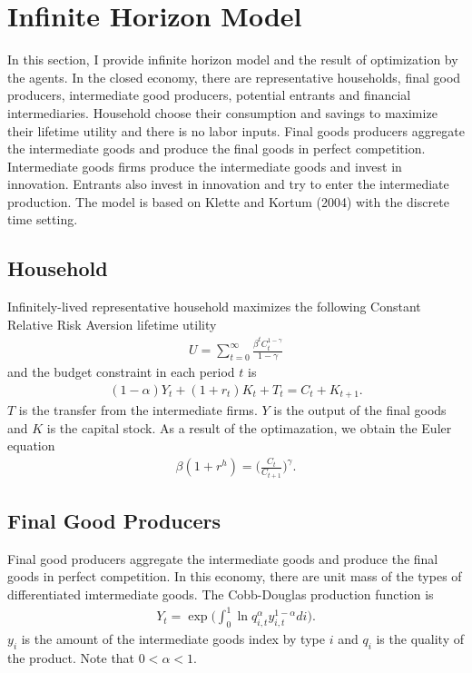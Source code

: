\documentclass[a4paper,12pt]{article}
\begin{document}
\section{Infinite Horizon Model}
In this section, I provide infinite horizon model and the result of optimization by the agents. In the closed economy, there are representative households, final good producers, intermediate good producers, potential entrants and financial intermediaries. Household choose their consumption and savings to maximize their lifetime utility and there is no labor inputs. Final goods producers aggregate the intermediate goods and produce the final goods in perfect competition. Intermediate goods firms produce the intermediate goods and invest in innovation. Entrants also invest in innovation and try to enter the intermediate production. The model is based on Klette and Kortum (2004) with the discrete time setting.
\subsection{Household}
Infinitely-lived representative household maximizes the following Constant Relative Risk Aversion lifetime utility
\begin{align}
    U = \sum_{t=0}^\infty \frac{\beta^t C_t^{1-\gamma}}{1-\gamma}
\end{align}
and the budget constraint in each period $t$ is 
\begin{align}
    (1-\alpha)Y_t + (1+r_t)K_t + T_t = C_t + K_{t+1}.
\end{align}
$T$ is the transfer from the intermediate firms. $Y$ is the output of the final goods and $K$ is the capital stock. As a result of the optimazation, we obtain the Euler equation
\begin{align}
    \beta ( 1+r^h) = \bigg(\frac{C_t}{C_{t+1}}\bigg)^\gamma.
\end{align}

\subsection{Final Good Producers}
Final good producers aggregate the intermediate goods and produce the final goods in perfect competition. In this economy, there are unit mass of the types of differentiated imtermediate goods. The Cobb-Douglas production function is
\begin{align}
    Y_t = \exp\bigg(\int_0^1 \ln q_{i,t}^\alpha y_{i,t}^{1-\alpha} di\bigg).
\end{align}
$y_i$ is the amount of the intermediate goods index by type $i$ and $q_i$ is the quality of the product. Note that $0<\alpha<1$.
\end{document}
